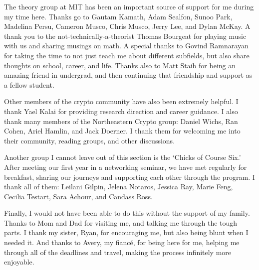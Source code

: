The theory group at MIT has been an important source of support for me during my time here. Thanks go to Gautam Kamath, Adam Sealfon, Sunoo Park, Madelina Persu, Cameron Musco, Chris Musco, Jerry Lee, and Dylan McKay. A thank you to the not-technically-a-theorist Thomas Bourgeat for playing music with us and sharing musings on math. A special thanks to Govind Ramnarayan for taking the time to not just teach me about different subfields, but also share thoughts on school, career, and life. Thanks also to Matt Staib for being an amazing friend in undergrad, and then continuing that friendship and support as a fellow student.

Other members of the crypto community have also been extremely helpful. I thank Yael Kalai for providing research direction and career guidance.
I also thank many members of the Northeastern Crypto group: Daniel Wichs, Ran Cohen, Ariel Hamlin, and Jack Doerner. I thank them for welcoming me into their community, reading groups, and other discussions.

Another group I cannot leave out of this section is the `Chicks of Course Six.' After meeting our first year in a networking seminar, we have met regularly for breakfast, sharing our journeys and supporting each other through the program. I thank all of them: Leilani Gilpin, Jelena Notaros, Jessica Ray, Marie Feng, Cecilia Testart, Sara Achour, and Candass Ross.

Finally, I would not have been able to do this without the support of my family. Thanks to Mom and Dad for visiting me, and talking me through the tough parts. I thank my sister, Ryan, for encouraging me, but also being blunt when I needed it. And thanks to Avery, my fianc\'e, for being here for me, helping me through all of the deadlines and travel, making the process infinitely more enjoyable.